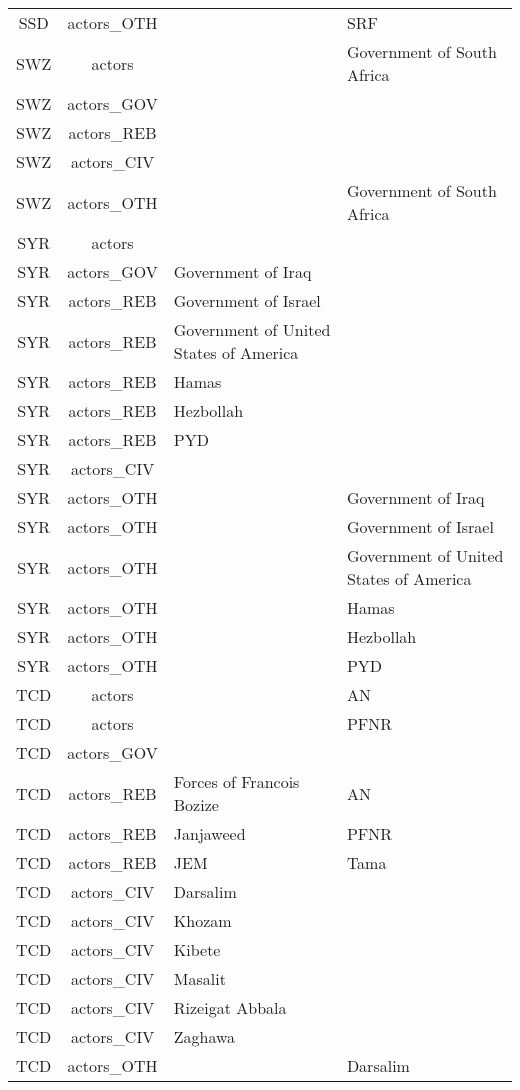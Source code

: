 \documentclass[12pt]{article}
\begin{document}
\begin{center}
\begin{longtable}{|c|c|p{7cm}|p{7cm}|}
  SSD & actors\_OTH &  & SRF \\ 
  SWZ & actors &  & Government of South Africa \\ 
  SWZ & actors\_GOV &  &  \\ 
  SWZ & actors\_REB &  &  \\ 
  SWZ & actors\_CIV &  &  \\ 
  SWZ & actors\_OTH &  & Government of South Africa \\ 
  SYR & actors &  &  \\ 
  SYR & actors\_GOV & Government of Iraq &  \\ 
  SYR & actors\_REB & Government of Israel &  \\ 
  SYR & actors\_REB & Government of United States of America &  \\ 
  SYR & actors\_REB & Hamas &  \\ 
  SYR & actors\_REB & Hezbollah &  \\ 
  SYR & actors\_REB & PYD &  \\ 
  SYR & actors\_CIV &  &  \\ 
  SYR & actors\_OTH &  & Government of Iraq \\ 
  SYR & actors\_OTH &  & Government of Israel \\ 
  SYR & actors\_OTH &  & Government of United States of America \\ 
  SYR & actors\_OTH &  & Hamas \\ 
  SYR & actors\_OTH &  & Hezbollah \\ 
  SYR & actors\_OTH &  & PYD \\ 
  TCD & actors &  & AN \\ 
  TCD & actors &  & PFNR \\ 
  TCD & actors\_GOV &  &  \\ 
  TCD & actors\_REB & Forces of Francois Bozize & AN \\ 
  TCD & actors\_REB & Janjaweed & PFNR \\ 
  TCD & actors\_REB & JEM & Tama \\ 
  TCD & actors\_CIV & Darsalim &  \\ 
  TCD & actors\_CIV & Khozam &  \\ 
  TCD & actors\_CIV & Kibete &  \\ 
  TCD & actors\_CIV & Masalit &  \\ 
  TCD & actors\_CIV & Rizeigat Abbala &  \\ 
  TCD & actors\_CIV & Zaghawa &  \\ 
  TCD & actors\_OTH &  & Darsalim \\ 

\end{longtable}
\end{center}
\end{document}
